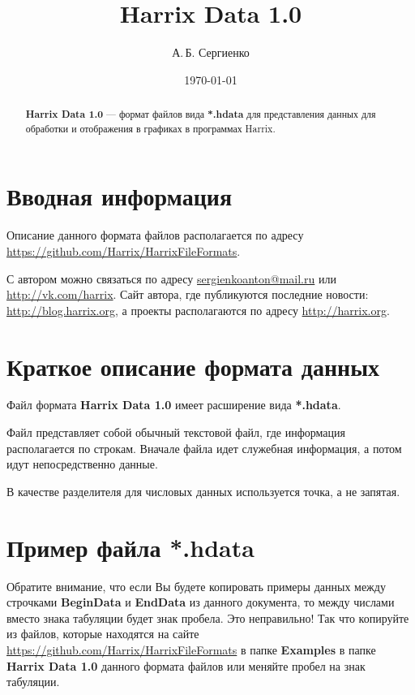 \documentclass[a4paper,12pt]{article}
\title{Harrix Data 1.0}
\author{А.\,Б. Сергиенко}
\date{\today}
\begin{document}


\maketitle

\begin{abstract}
\textbf{Harrix Data 1.0} --- формат файлов вида \textbf{*.hdata} для представления данных для обработки и отображения в графиках в программах Harrix.
\end{abstract}

\tableofcontents

\newpage

\section{Вводная информация}

Описание данного формата файлов располагается по адресу \href {https://github.com/Harrix/HarrixFileFormats} {https://github.com/Harrix/HarrixFileFormats}.

С автором можно связаться по адресу \href {mailto:sergienkoanton@mail.ru} {sergienkoanton@mail.ru} или  \href {http://vk.com/harrix} {http://vk.com/harrix}. Сайт автора, где публикуются последние новости: \href {http://blog.harrix.org} {http://blog.harrix.org}, а проекты располагаются по адресу \href {http://harrix.org} {http://harrix.org}.


\section{Краткое описание формата данных}

Файл формата \textbf{Harrix Data 1.0} имеет расширение вида \textbf{*.hdata}.

Файл представляет собой обычный текстовой файл, где информация располагается по строкам. Вначале файла идет служебная информация, а потом идут непосредственно данные.

В качестве разделителя для числовых данных используется точка, а не запятая.

\section{Пример файла *.hdata}

Обратите внимание, что если Вы будете копировать примеры данных между строчками \textbf{BeginData} и \textbf{EndData} из данного документа, то между числами вместо знака табуляции будет знак пробела. Это неправильно! Так что копируйте из файлов, которые находятся на сайте \href {https://github.com/Harrix/HarrixFileFormats} {https://github.com/Harrix/HarrixFileFormats} в папке \textbf{Examples} в папке \textbf{Harrix Data 1.0} данного формата файлов или меняйте пробел на знак табуляции.
\end{document}
